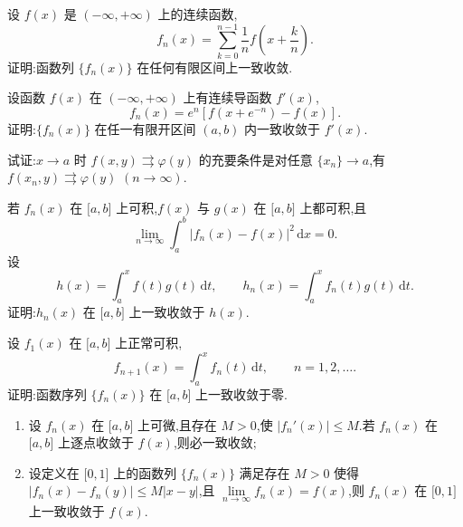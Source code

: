 \documentclass[../数学分析培优讲义.tex]{subfiles}
\begin{document}
\begin{example}
设 $f(x)$ 是 $(-\infty,+\infty)$ 上的连续函数,
\[
    f_n(x)=\sum\limits_{k=0}^{n-1}\dfrac{1}{n}f\left(x+\dfrac{k}{n}\right).
\]
证明:函数列 $\{f_n(x)\}$ 在任何有限区间上一致收敛.
\end{example}
\exampleblank

\begin{example}
设函数 $f(x)$ 在 $(-\infty,+\infty)$ 上有连续导函数 $f'(x)$,
\[
    f_n(x)=e^n\left[f(x+e^{-n})-f(x)\right].
\]
证明:$\{f_n(x)\}$ 在任一有限开区间 $(a,b)$ 内一致收敛于 $f'(x)$.
\end{example}
\exampleblank

\begin{example}
试证:$x\to a$ 时 $f(x,y)\rightrightarrows\varphi(y)$ 的充要条件是对任意 $\{x_n\}\to a$,有 $f(x_n,y)\rightrightarrows\varphi(y)$ $(n\to\infty)$.
\end{example}
\exampleblank

\begin{example}
若 $f_n(x)$ 在 $\lbrack a,b\rbrack$ 上可积,$f(x)$ 与 $g(x)$ 在 $\lbrack a,b\rbrack$ 上都可积,且
\[
    \lim\limits_{n\to\infty}\int_a^b|f_n(x)-f(x)|^2\,\mathrm{d}x=0.
\]
设
\[
    h(x)=\int_a^x f(t)g(t)\,\mathrm{d}t,
    \qquad
    h_n(x)=\int_a^x f_n(t)g(t)\,\mathrm{d}t.
\]
证明:$h_n(x)$ 在 $\lbrack a,b\rbrack$ 上一致收敛于 $h(x)$.
\end{example}
\exampleblank

\begin{example}
设 $f_1(x)$ 在 $\lbrack a,b\rbrack$ 上正常可积,
\[
    f_{n+1}(x)=\int_a^x f_n(t)\,\mathrm{d}t,
    \qquad n=1,2,\ldots.
\]
证明:函数序列 $\{f_n(x)\}$ 在 $\lbrack a,b\rbrack$ 上一致收敛于零.
\end{example}
\exampleblank

\begin{example}
\begin{enumerate}[label=(\arabic*)]
    \item 设 $f_n(x)$ 在 $\lbrack a,b\rbrack$ 上可微,且存在 $M>0$,使 $|f_n'(x)|\leq M$.若 $f_n(x)$ 在 $\lbrack a,b\rbrack$ 上逐点收敛于 $f(x)$,则必一致收敛;
    \item 设定义在 $\lbrack 0,1\rbrack$ 上的函数列 $\{f_n(x)\}$ 满足存在 $M>0$ 使得
    $|f_n(x)-f_n(y)|\leq M|x-y|$,且 $\displaystyle\lim\limits_{n\to\infty}f_n(x)=f(x)$,则 $f_n(x)$ 在 $\lbrack 0,1\rbrack$ 上一致收敛于 $f(x)$.
\end{enumerate}
\end{example}
\exampleblank
\end{document}
